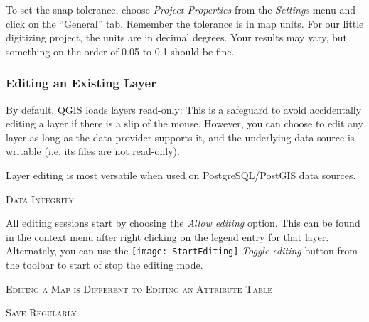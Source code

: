 To set the snap tolerance, choose \textsl{Project Properties} from the
\textsl{Settings} menu and click on the ``General'' tab.  Remember the
tolerance is in map units. For our little digitizing project, the units
are in decimal degrees.  Your results may vary, but something on the order
of 0.05 to 0.1 should be fine. 

\subsubsection{Editing an Existing Layer}
\label{sec:edit_existing_layer}

By default, QGIS loads layers read-only: This is a safeguard
to avoid accidentally editing a layer if there is a slip of the mouse.
However, you can choose to edit any layer as long as the data provider supports it,
and the underlying data source is writable (i.e. its files are not read-only).

Layer editing is most versatile when used on PostgreSQL/PostGIS data sources. 

\begin{Tip}[h]\caption{\textsc{Data Integrity}}
\end{Tip}

All editing sessions start by choosing the \textit{Allow editing} option.
This can be found in the context menu after right clicking on the legend
entry for that layer.
Alternately, you can use the  \texttt{[image: StartEditing]} 
\textit{Toggle editing} button from the toolbar to start of stop the editing mode.

\begin{Tip}[h]\caption{\textsc{Editing a Map is Different to Editing an Attribute Table}}
\end{Tip}

\begin{Tip}[h]\caption{\textsc{Save Regularly}}
\end{Tip}

